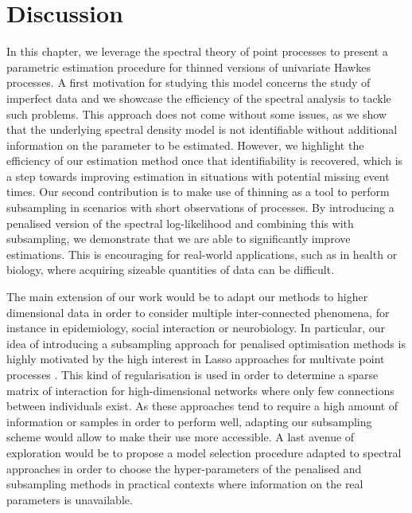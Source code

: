 \section{Discussion}
    In this chapter, we leverage the spectral theory of point processes to present a parametric estimation procedure for thinned versions of univariate Hawkes processes.
    A first motivation for studying this model concerns the study of imperfect data and we showcase the efficiency of the spectral analysis to tackle such problems.
    This approach does not come without some issues, as we show that the underlying spectral density model is not identifiable without additional information on the parameter to be estimated.
    However, we highlight the efficiency of our estimation method once that identifiability is recovered, which is a step towards improving estimation in situations with potential missing event times.
    Our second contribution is to make use of thinning as a tool to perform subsampling in scenarios with short observations of processes. 
    By introducing a penalised version of the spectral log-likelihood and combining this with subsampling, we demonstrate that we are able to significantly improve estimations. 
    This is encouraging for real-world applications, such as in health or biology, where acquiring sizeable quantities of data can be difficult.

    The main extension of our work would be to adapt our methods to higher dimensional data in order to consider multiple inter-connected phenomena, for instance in epidemiology, social interaction or neurobiology.
    In particular, our idea of introducing a subsampling approach for penalised optimisation methods is highly motivated by the high interest in Lasso approaches for multivate point processes \parencite{Reynaud2013, Hansen2015, Bacry2020}.
    This kind of regularisation is used in order to determine a sparse matrix of interaction for high-dimensional networks where only few connections between individuals exist.
    As these approaches tend to require a high amount of information or samples in order to perform well, adapting our subsampling scheme would allow to make their use more accessible.
    A last avenue of exploration would be to propose a model selection procedure adapted to spectral approaches in order to choose the hyper-parameters of the penalised and subsampling methods in practical contexts where information on the real parameters is unavailable.



